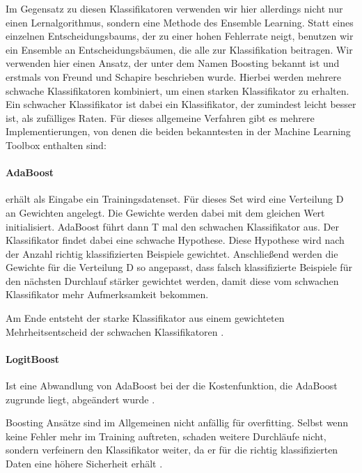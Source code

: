 Im Gegensatz zu diesen Klassifikatoren verwenden wir hier allerdings nicht nur einen Lernalgorithmus, sondern eine Methode des Ensemble Learning. Statt eines einzelnen Entscheidungsbaums, der zu einer hohen Fehlerrate neigt, benutzen wir ein Ensemble an Entscheidungsbäumen, die alle zur Klassifikation beitragen. Wir verwenden hier einen Ansatz, der unter dem Namen Boosting bekannt ist und erstmals von Freund und Schapire \cite{Freund1997} beschrieben wurde. Hierbei werden mehrere schwache Klassifikatoren kombiniert, um einen starken Klassifikator zu erhalten. Ein schwacher Klassifikator ist dabei ein Klassifikator, der zumindest leicht besser ist, als zufälliges Raten. Für dieses allgemeine Verfahren gibt es mehrere Implementierungen, von denen die beiden bekanntesten in der Machine Learning Toolbox enthalten sind:

\paragraph{AdaBoost} erhält als Eingabe ein Trainingsdatenset. Für dieses Set wird eine Verteilung D an Gewichten angelegt. Die Gewichte werden dabei mit dem gleichen Wert initialisiert. AdaBoost führt dann T mal den schwachen Klassifikator aus. Der Klassifikator findet dabei eine schwache Hypothese. Diese Hypothese wird nach der Anzahl richtig klassifizierten Beispiele gewichtet. Anschließend werden die Gewichte für die Verteilung D so angepasst, dass falsch klassifizierte Beispiele für den nächsten Durchlauf stärker gewichtet werden, damit diese vom schwachen Klassifikator mehr Aufmerksamkeit bekommen.

Am Ende entsteht der starke Klassifikator aus einem gewichteten Mehrheitsentscheid der schwachen Klassifikatoren \cite{Boosting03_Schapire}.


\paragraph{LogitBoost} Ist eine Abwandlung von AdaBoost bei der die Kostenfunktion, die AdaBoost zugrunde liegt, abgeändert wurde \cite{Friedman00specialinvited}.

Boosting Ansätze sind im Allgemeinen nicht anfällig für overfitting. Selbst wenn keine Fehler mehr im Training auftreten, schaden weitere Durchläufe nicht, sondern verfeinern den Klassifikator weiter, da er für die richtig klassifizierten Daten eine höhere Sicherheit erhält \cite{ExplainingAdaBoost_Schapire}.

